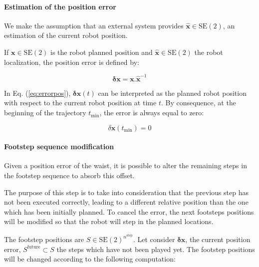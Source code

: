 \vspace{0.3cm}
\paragraph{Estimation of the position error}

We make the assumption that an external system provides
\mbox{$\hat{\mathbf{x}} \in \text{SE}(2)$}, an estimation of the
current robot position.

If $\mathbf{x} \in \text{SE}(2)$ is the robot planned position and
$\hat{\mathbf{x}} \in \text{SE}(2)$ the robot localization, the
position error is defined by:

\begin{equation} \label{eq:errorpos}
  \mathbf{\delta x} = \mathbf{x} . \hat{\mathbf{x}}^{-1}
\end{equation}

In Eq. (\ref{eq:errorpos}), $\mathbf{\delta x}(t)$ can be
interpreted as the planned robot position with respect to the current
robot position at time $t$. By consequence, at the beginning of the
trajectory $t_{\text{min}}$, the error is always equal to zero:

\begin{equation} \label{eq:errorpos_prop}
  \delta \mathbf{x}(t_{\text{min}}) = 0
\end{equation}

\vspace{0.3cm}
\paragraph{Footstep sequence modification}


Given a position error of the waist, it is possible to alter the
remaining steps in the footstep sequence to absorb this offset.

The purpose of this step is to take into consideration that the
previous step has not been executed correctly, leading to a different
relative position than the one which has been initially planned. To
cancel the error, the next footsteps positions will be modified
so that the robot will step in the planned locations.


The footstep positions are \mbox{$S \in
  \text{SE}(2)^{n^\text{step}}$}. Let consider $\mathbf{\delta {x}}$,
the current position error, \mbox{$S^{\text{future}} \subset S$} the
steps which have not been played yet. The footstep positions will be
changed according to the following computation:

